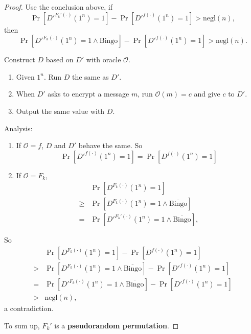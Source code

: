 \documentclass[12pt]{article}
\newcommand{\negl}{\text{negl}}
\newcommand{\Bingo}{\text{Bingo}}
\newcommand{\OO}{\mathcal{O}}
\newenvironment{problem}[2][Problem]{\begin{trivlist}
\item[\hskip \labelsep {\bfseries #1}\hskip \labelsep {\bfseries #2.}]}{\end{trivlist}}
\begin{document}
\begin{problem}{10}
\begin{proof}
Use the conclusion above, if \[\Pr[{D'}^{F_k'(\cdot)}(1^n)=1]-\Pr[D'^{f(\cdot)}(1^n)=1]>\negl(n),\]
then \[\Pr[{D'}^{F_k(\cdot)}(1^n)=1\land\overline{\Bingo}]-\Pr[D'^{f(\cdot)}(1^n)=1]>\negl(n).\]\par
\vspace{2ex}
Construct $D$ based on $D'$ with oracle $\OO$. 
\begin{enumerate}
    \item Given $1^n$. Run $D$ the same as $D'$.
    \item When $D'$ asks to encrypt a message $m$, run $\OO(m)=c$ and give $c$ to $D'$.
    \item Output the same value with $D$.
\end{enumerate}
Analysis:\begin{enumerate}
    \item If $\OO=f$, $D$ and $D'$ behave the same. So
    \[ \Pr[D'^{f(\cdot)}(1^n)=1]=\Pr[D^{f(\cdot)}(1^n)=1] \]
    \item If $\OO=F_k$, 
    \begin{align*}
        &\Pr[{D}^{F_k(\cdot)}(1^n)=1]\\
        \ge &\Pr[{D}^{F_k(\cdot)}(1^n)=1\land\overline{\Bingo}]\\
        =&\Pr[{D'}^{F_k'(\cdot)}(1^n)=1\land\overline{\Bingo}],
    \end{align*}
\end{enumerate}
So 
\begin{align*}
    &\Pr[{D}^{F_k(\cdot)}(1^n)=1]-\Pr[D^{f(\cdot)}(1^n)=1]\\
    >&\Pr[{D}^{F_k(\cdot)}(1^n)=1\land\overline{\Bingo}]-\Pr[D'^{f(\cdot)}(1^n)=1]\\
    =&\Pr[{D'}^{F_k(\cdot)}(1^n)=1\land\overline{\Bingo}]-\Pr[D'^{f(\cdot)}(1^n)=1]\\
    >&\negl(n),
\end{align*}
a contradiction.\par
To sum up, $F_k'$ is a \textbf{pseudorandom permutation}.
\end{proof}
\end{problem}
\end{document}

